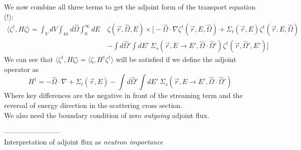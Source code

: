 \documentclass[12pt]{article}
\newcommand{\rvec}{\ensuremath{\vec{r}}}
\newcommand{\vOmega}{\ensuremath{\hat{\Omega}}}
\begin{document}
%
We now combine all three terms to get the adjoint form of the transport equation (!):
\begin{align*}
\langle\zeta^{\dagger}, H \zeta\rangle = \int_{V} dV \int_{4\pi} d\vOmega \int_0^{\infty} dE \: &\zeta (\rvec, \vOmega, E) \times \biggl[-\vOmega \cdot \nabla \zeta^{\dagger}(\vec{r}, E, \vOmega)  + \Sigma_t(\rvec,E) \zeta^{\dagger}(\vec{r}, E, \vOmega) \\&- \int d\vOmega' \int dE'\: \Sigma_s(\rvec, E \rightarrow E', \vOmega \cdot \vOmega') \zeta^{\dagger}(\rvec, \vOmega', E') \biggr]
\end{align*}
%
We can see that $\langle\zeta^{\dagger}, H \zeta\rangle = \langle\zeta, H^{\dagger} \zeta^{\dagger}\rangle$ will be satisfied if we define the adjoint operator as
\[
H^{\dagger} = -\vOmega \cdot \nabla  + \Sigma_t(\rvec,E) - \int d\vOmega' \int dE'\: \Sigma_s(\rvec, E \rightarrow E', \vOmega \cdot \vOmega')
\]
Where key differences are the negative in front of the streaming term and the reversal of energy direction in the scattering cross section.\\
We also need the boundary condition of zero \textit{outgoing} adjoint flux.

------------------------\\
Interpretation of adjoint flux as \textit{neutron importance}
\end{document}
